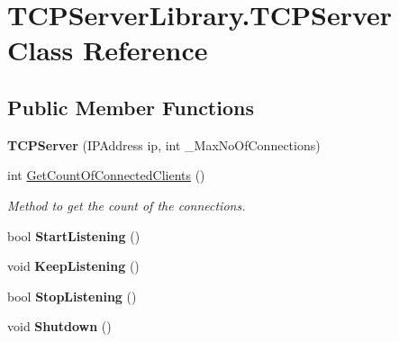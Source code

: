 \hypertarget{class_t_c_p_server_library_1_1_t_c_p_server}{
\section{TCPServerLibrary.TCPServer Class Reference}
\label{class_t_c_p_server_library_1_1_t_c_p_server}
}
\subsection*{Public Member Functions}
\begin{DoxyCompactItemize}
\item 
\hypertarget{class_t_c_p_server_library_1_1_t_c_p_server_aca05a74f244dbc0988179eda7c24c68f}{
{\bfseries TCPServer} (IPAddress ip, int \_\-MaxNoOfConnections)}
\label{class_t_c_p_server_library_1_1_t_c_p_server_aca05a74f244dbc0988179eda7c24c68f}

\item 
int \hyperlink{class_t_c_p_server_library_1_1_t_c_p_server_aa826da2fbc53ac9b87d5ea410fca7f4d}{GetCountOfConnectedClients} ()
\begin{DoxyCompactList}\small\item\em Method to get the count of the connections. \item\end{DoxyCompactList}\item 
\hypertarget{class_t_c_p_server_library_1_1_t_c_p_server_afff178cf95a07e1372aee411b49f6b0d}{
bool {\bfseries StartListening} ()}
\label{class_t_c_p_server_library_1_1_t_c_p_server_afff178cf95a07e1372aee411b49f6b0d}

\item 
\hypertarget{class_t_c_p_server_library_1_1_t_c_p_server_a8103bc134bf9f7e865a8bb1c68e1ec51}{
void {\bfseries KeepListening} ()}
\label{class_t_c_p_server_library_1_1_t_c_p_server_a8103bc134bf9f7e865a8bb1c68e1ec51}

\item 
\hypertarget{class_t_c_p_server_library_1_1_t_c_p_server_a6076e98d1f9940f4ec5f8af7fdbbb4b4}{
bool {\bfseries StopListening} ()}
\label{class_t_c_p_server_library_1_1_t_c_p_server_a6076e98d1f9940f4ec5f8af7fdbbb4b4}

\item 
\hypertarget{class_t_c_p_server_library_1_1_t_c_p_server_a3466694837dbb004af327ce4e2fb6972}{
void {\bfseries Shutdown} ()}
\label{class_t_c_p_server_library_1_1_t_c_p_server_a3466694837dbb004af327ce4e2fb6972}

\end{DoxyCompactItemize}
